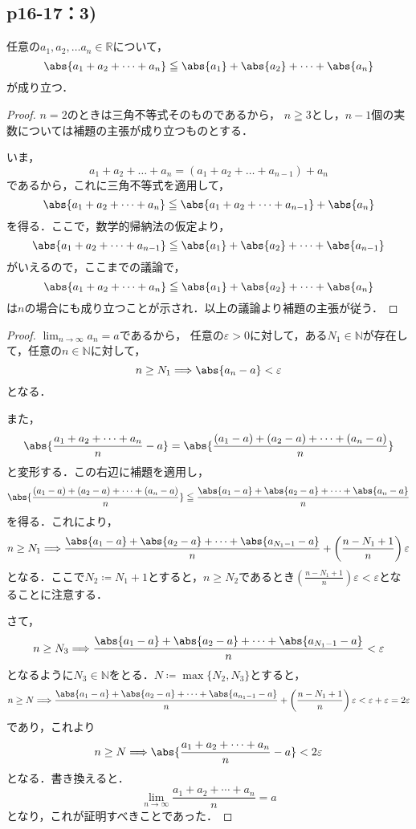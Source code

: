 \documentclass[a4paper,10pt,fleqn]{ltjsarticle}
\begin{document}
\subsection*{p16-17：3)}


    任意の$a_1 , a_2 , \dots a_n \in \mathbb{R}$について，
    \[
        \abs{a_1+a_2+\dots+a_n} \leqq \abs{a_1}+\abs{a_2}+\dots+\abs{a_n}
    \]
    が成り立つ．


\begin{proof}
    $n=2$のときは三角不等式そのものであるから，
    $n \geqq 3$とし，$n-1$個の実数については補題の主張が成り立つものとする．

    いま，
    \[
        a_1 + a_2 + \dots + a_n = (a_1+a_2+\dots+a_{n-1})+a_n
    \]
    であるから，これに三角不等式を適用して，
    \[
        \abs{a_1+a_2+\dots+a_n} \leqq \abs{a_1+a_2+\dots+a_{n-1}} +\abs{a_n}
    \]
    を得る．ここで，数学的帰納法の仮定より，
    \[
        \abs{a_1+a_2+\dots+a_{n-1}} \leqq \abs{a_1}+\abs{a_2}+\dots+\abs{a_{n-1}}
    \]
    がいえるので，ここまでの議論で，
    \[
        \abs{a_1+a_2+\dots+a_n} \leqq \abs{a_1}+\abs{a_2}+\dots+\abs{a_n}
    \]
    は$n$の場合にも成り立つことが示され．以上の議論より補題の主張が従う．
\end{proof}

\begin{tleftbar}
    \begin{proof}
    $\lim_{n \to \infty} a_n =a$であるから，
    任意の$\varepsilon >0$に対して，ある$N_1 \in \mathbb{N}$が存在して，任意の$n \in \mathbb{N}$に対して，
    \[
        n \ge N_1 \Longrightarrow \abs{a_n -a}<\varepsilon 
    \]
    となる．

    また，
    \[
        \abs{\frac{a_1+a_2+\cdots+a_n}{n}-a}= \abs{\frac{(a_1-a)+(a_2-a)+\cdots+(a_n-a)}{n}}
    \]
    と変形する．この右辺に補題を適用し，
    \[
        \abs{\frac{(a_1-a)+(a_2-a)+\cdots+(a_n-a)}{n}} \leqq \frac{\abs{a_1-a}+\abs{a_2-a}+\cdots+\abs{a_n-a}}{n}
    \]
    を得る．これにより，
    \[
        n \ge N_1 \Longrightarrow \frac{\abs{a_1-a}+\abs{a_2-a}+\cdots+\abs{a_{N_1-1}-a}}{n} +\left( \frac{n-N_1+1}{n} \right ) \varepsilon 
    \]
    となる．ここで$N_2 \coloneqq N_1 +1$とすると，$n \ge N_2$であるとき$\left( \frac{n-N_1+1}{n} \right ) \varepsilon < \varepsilon$となることに注意する．
    
    さて，
    \[
        n \ge N_3 \Longrightarrow \frac{\abs{a_1-a}+\abs{a_2-a}+\cdots+\abs{a_{N_1-1}-a}}{n}<\varepsilon
    \]
    となるように$N_3 \in \mathbb{N}$をとる．$N \coloneqq \max \{ N_2 , N_3 \}$とすると，
    \[
        n \ge N \Longrightarrow \frac{\abs{a_1-a}+\abs{a_2-a}+\cdots+\abs{a_{n_1-1}-a}}{n} +\left( \frac{n-N_1+1}{n} \right ) \varepsilon < \varepsilon + \varepsilon = 2 \varepsilon
    \]
    であり，これより
    \[
        n \ge N \Longrightarrow \abs{\frac{a_1+a_2+\cdots+a_n}{n}-a} < 2 \varepsilon
    \]
    となる．書き換えると．
    \[
        \lim_{n \to \infty} \frac{a_1+a_2+\cdots+a_n}{n}=a
    \]
    となり，これが証明すべきことであった．
    \end{proof}
\end{tleftbar}
\end{document}
